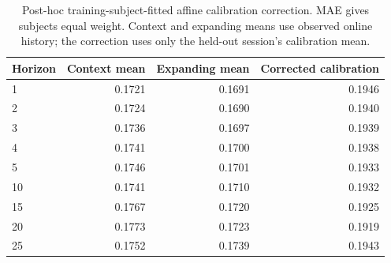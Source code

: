 \begin{table}[!ht]
\centering\small
\setlength{\tabcolsep}{5pt}
\caption{Post-hoc training-subject-fitted affine calibration correction. MAE gives subjects equal weight. Context and expanding means use observed online history; the correction uses only the held-out session's calibration mean.}
\label{tab:supp_calibration_correction}
\begin{tabular}{lrrr}
\toprule
Horizon & Context mean & Expanding mean & Corrected calibration \\
\midrule
1 & 0.1721 & 0.1691 & 0.1946 \\
2 & 0.1724 & 0.1690 & 0.1940 \\
3 & 0.1736 & 0.1697 & 0.1939 \\
4 & 0.1741 & 0.1700 & 0.1938 \\
5 & 0.1746 & 0.1701 & 0.1933 \\
10 & 0.1741 & 0.1710 & 0.1932 \\
15 & 0.1767 & 0.1720 & 0.1925 \\
20 & 0.1773 & 0.1723 & 0.1919 \\
25 & 0.1752 & 0.1739 & 0.1943 \\
\bottomrule\end{tabular}\end{table}
